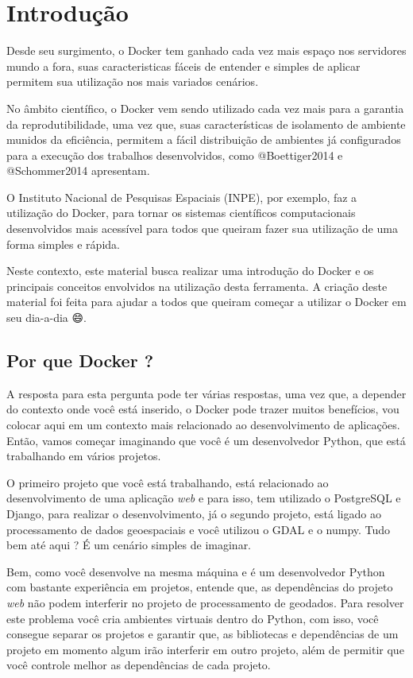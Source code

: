 \documentclass[]{article}
\title{}
\author{}
\date{}
\begin{document}
{
\setcounter{tocdepth}{2}
\tableofcontents
}
\hypertarget{introducao}{%
\section{Introdução}\label{introducao}}

Desde seu surgimento, o Docker tem ganhado cada vez mais espaço nos servidores mundo a fora, suas caracteristicas fáceis de entender e simples de aplicar permitem sua utilização nos mais variados cenários.

No âmbito científico, o Docker vem sendo utilizado cada vez mais para a garantia da reprodutibilidade, uma vez que, suas características de isolamento de ambiente munidos da eficiência, permitem a fácil distribuição de ambientes já configurados para a execução dos trabalhos desenvolvidos, como @Boettiger2014 e @Schommer2014 apresentam.

O Instituto Nacional de Pesquisas Espaciais (INPE), por exemplo, faz a utilização do Docker, para tornar os sistemas científicos computacionais desenvolvidos mais acessível para todos que queiram fazer sua utilização de uma forma simples e rápida.

Neste contexto, este material busca realizar uma introdução do Docker e os principais conceitos envolvidos na utilização desta ferramenta. A criação deste material foi feita para ajudar a todos que queiram começar a utilizar o Docker em seu dia-a-dia 😄.

\hypertarget{por-que-docker}{%
\subsection{Por que Docker ?}\label{por-que-docker}}

A resposta para esta pergunta pode ter várias respostas, uma vez que, a depender do contexto onde você está inserido, o Docker pode trazer muitos benefícios, vou colocar aqui em um contexto mais relacionado ao desenvolvimento de aplicações. Então, vamos começar imaginando que você é um desenvolvedor Python, que está trabalhando em vários projetos.

O primeiro projeto que você está trabalhando, está relacionado ao desenvolvimento de uma aplicação \emph{web} e para isso, tem utilizado o PostgreSQL e Django, para realizar o desenvolvimento, já o segundo projeto, está ligado ao processamento de dados geoespaciais e você utilizou o GDAL e o numpy. Tudo bem até aqui ? É um cenário simples de imaginar.

Bem, como você desenvolve na mesma máquina e é um desenvolvedor Python com bastante experiência em projetos, entende que, as dependências do projeto \emph{web} não podem interferir no projeto de processamento de geodados. Para resolver este problema você cria ambientes virtuais dentro do Python, com isso, você consegue separar os projetos e garantir que, as bibliotecas e dependências de um projeto em momento algum irão interferir em outro projeto, além de permitir que você controle melhor as dependências de cada projeto.
\end{document}
